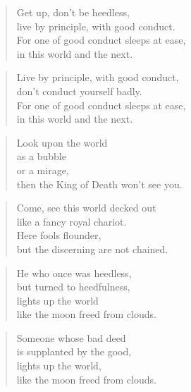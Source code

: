 \documentclass[12pt,openany]{book}%
\begin{document}
\begin{verse}%
Get up, don’t be heedless, \\
live by principle, with good conduct. \\
For one of good conduct sleeps at ease, \\
in this world and the next. 

%
\end{verse}

\begin{verse}%
Live by principle, with good conduct, \\
don’t conduct yourself badly. \\
For one of good conduct sleeps at ease, \\
in this world and the next. 

%
\end{verse}

\begin{verse}%
Look upon the world \\
as a bubble \\
or a mirage, \\
then the King of Death won’t see you. 

%
\end{verse}

\begin{verse}%
Come, see this world decked out \\
like a fancy royal chariot. \\
Here fools flounder, \\
but the discerning are not chained. 

%
\end{verse}

\begin{verse}%
He who once was heedless, \\
but turned to heedfulness, \\
lights up the world \\
like the moon freed from clouds. 

%
\end{verse}

\begin{verse}%
Someone whose bad deed \\
is supplanted by the good, \\
lights up the world, \\
like the moon freed from clouds. 

%
\end{verse}
\end{document}
